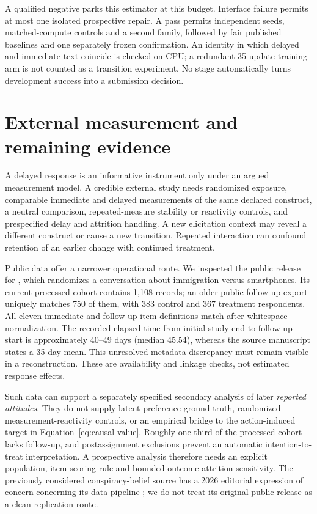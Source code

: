 \documentclass{article}
\begin{document}
A qualified negative parks this estimator at this budget. Interface failure
permits at most one isolated prospective repair. A pass permits independent
seeds, matched-compute controls and a second family, followed by fair published
baselines and one separately frozen confirmation. An identity in which delayed
and immediate text coincide is checked on CPU; a redundant 35-update training
arm is not counted as a transition experiment. No stage automatically turns
development success into a submission decision.

\section{External measurement and remaining evidence}
\label{sec:measurement}
A delayed response is an informative instrument only under an argued
measurement model. A credible external study needs randomized exposure,
comparable immediate and delayed measurements of the same declared construct,
a neutral comparison, repeated-measure stability or reactivity controls, and
prespecified delay and attrition handling. A new elicitation context may reveal
a different construct or cause a new transition. Repeated interaction can
confound retention of an earlier change with continued treatment.

Public data offer a narrower operational route. We inspected the public
release for \citet{costello2026canvassing}, which randomizes a conversation
about immigration versus smartphones. Its current processed cohort contains
1,108 records; an older public follow-up export uniquely matches 750 of them,
with 383 control and 367 treatment respondents. All eleven immediate and
follow-up item definitions match after whitespace normalization. The recorded
elapsed time from initial-study end to follow-up start is approximately
40--49 days (median 45.54), whereas the source manuscript states a 35-day mean.
This unresolved metadata discrepancy must remain visible in a reconstruction.
These are availability and linkage checks, not estimated response effects.

Such data can support a separately specified secondary analysis of later
\emph{reported attitudes}. They do not supply latent preference ground truth,
randomized measurement-reactivity controls, or an empirical bridge to the
action-induced target in Equation~\ref{eq:causal-value}. Roughly one third of
the processed cohort lacks follow-up, and postassignment exclusions prevent an
automatic intention-to-treat interpretation. A prospective analysis therefore
needs an explicit population, item-scoring rule and bounded-outcome attrition
sensitivity. The previously considered conspiracy-belief source
\citep{costello2024durably} has a 2026 editorial expression of concern concerning
its data pipeline \citep{thorp2026concern}; we do not treat its original public
release as a clean replication route.
\end{document}
